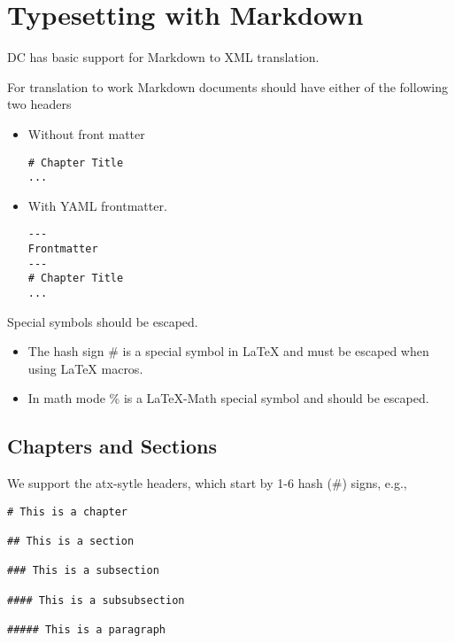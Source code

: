 

\section{Typesetting with Markdown}

DC has basic support for Markdown to XML translation.  

\begin{gram}[Header]
For translation to work Markdown documents should have either of the following two headers
\begin{itemize}
\item Without front matter
\begin{lstlisting}
# Chapter Title
...
\end{lstlisting}  

\item  With YAML frontmatter.
\begin{lstlisting}
--- 
Frontmatter
---
# Chapter Title
...
\end{lstlisting}  
\end{itemize}
\end{gram}

\begin{important}
Special symbols should be escaped.
\begin{itemize}
\item The hash sign \# is a special symbol in LaTeX and must be escaped when using LaTeX macros.
\item In math mode \% is a LaTeX-Math special symbol and should be escaped.
\end{itemize}
\end{important}

\subsection{Chapters and Sections}

We support the atx-sytle headers, which start by 1-6 hash (\#) signs, e.g.,
\begin{lstlisting}
# This is a chapter

## This is a section

### This is a subsection

#### This is a subsubsection

##### This is a paragraph
\end{lstlisting}



